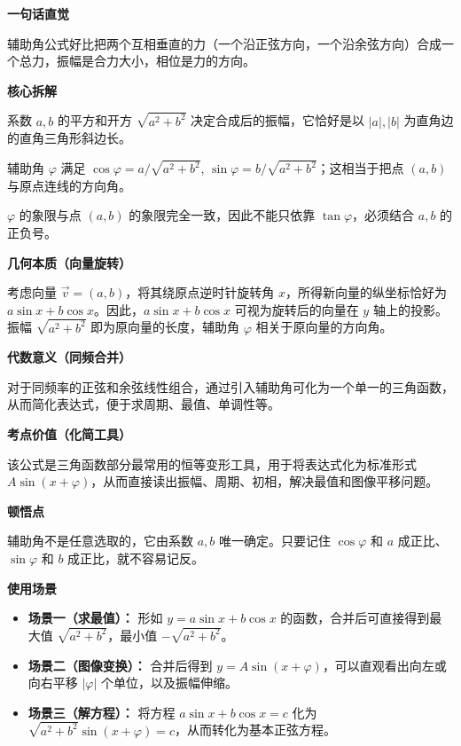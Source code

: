 \begin{explanationbox}

	\textbf{\textcolor{CExplanation}{一句话直觉}}

	辅助角公式好比把两个互相垂直的力（一个沿正弦方向，一个沿余弦方向）合成一个总力，振幅是合力大小，相位是力的方向。

	\medskip
	\textbf{\textcolor{CExplanation}{核心拆解}}
	\begin{description}[style=nextline, leftmargin=2.8em, labelsep=0.5em, itemsep=0.45em]
		\item[\textbf{要点一（振幅计算）：}] 系数 $a,b$ 的平方和开方 $\sqrt{a^{2}+b^{2}}$ 决定合成后的振幅，它恰好是以 $|a|,|b|$ 为直角边的直角三角形斜边长。
		\item[\textbf{要点二（辅助角定义）：}] 辅助角 $\varphi$ 满足 $\cos\varphi = a/\sqrt{a^{2}+b^{2}}$, $\sin\varphi = b/\sqrt{a^{2}+b^{2}}$；这相当于把点 $(a,b)$ 与原点连线的方向角。
		\item[\textbf{要点三（象限确定）：}] $\varphi$ 的象限与点 $(a,b)$ 的象限完全一致，因此不能只依靠 $\tan\varphi$，必须结合 $a,b$ 的正负号。
	\end{description}

	\medskip
	\textbf{\textcolor{CExplanation}{几何本质（向量旋转）}}

	考虑向量 $\vec{v} = (a,b)$，将其绕原点逆时针旋转角 $x$，所得新向量的纵坐标恰好为 $a\sin x + b\cos x$。因此，$a\sin x + b\cos x$ 可视为旋转后的向量在 $y$ 轴上的投影。振幅 $\sqrt{a^{2}+b^{2}}$ 即为原向量的长度，辅助角 $\varphi$ 相关于原向量的方向角。

	\medskip
	\textbf{\textcolor{CExplanation}{代数意义（同频合并）}}

	对于同频率的正弦和余弦线性组合，通过引入辅助角可化为一个单一的三角函数，从而简化表达式，便于求周期、最值、单调性等。

	\medskip
	\textbf{\textcolor{CExplanation}{考点价值（化简工具）}}

	该公式是三角函数部分最常用的恒等变形工具，用于将表达式化为标准形式 $A\sin(x+\varphi)$，从而直接读出振幅、周期、初相，解决最值和图像平移问题。

	\medskip
	\textbf{\textcolor{CExplanation}{顿悟点}}

	辅助角不是任意选取的，它由系数 $a,b$ 唯一确定。只要记住 $\cos\varphi$ 和 $a$ 成正比、$\sin\varphi$ 和 $b$ 成正比，就不容易记反。

	\medskip
	\textbf{\textcolor{CExplanation}{使用场景}}
	\begin{itemize}[leftmargin=*, itemsep=0.5em, topsep=0.4em]
		\item \textbf{场景一（求最值）：} 形如 $y = a\sin x + b\cos x$ 的函数，合并后可直接得到最大值 $\sqrt{a^{2}+b^{2}}$，最小值 $-\sqrt{a^{2}+b^{2}}$。
		\item \textbf{场景二（图像变换）：} 合并后得到 $y = A\sin(x+\varphi)$，可以直观看出向左或向右平移 $|\varphi|$ 个单位，以及振幅伸缩。
		\item \textbf{场景三（解方程）：} 将方程 $a\sin x + b\cos x = c$ 化为 $\sqrt{a^{2}+b^{2}}\sin(x+\varphi)=c$，从而转化为基本正弦方程。
	\end{itemize}
\end{explanationbox}
